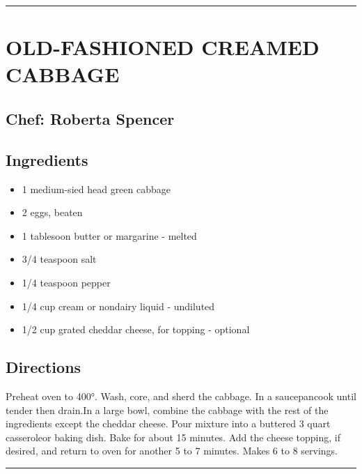 \documentclass[
]{book}
\providecommand{\tightlist}{%
  \setlength{\itemsep}{0pt}\setlength{\parskip}{0pt}}
\begin{document}
\begin{center}\rule{0.5\linewidth}{0.5pt}\end{center}

\hypertarget{old-fashioned-creamed-cabbage}{%
\section*{OLD-FASHIONED CREAMED CABBAGE}\label{old-fashioned-creamed-cabbage}}


\hypertarget{chef-roberta-spencer-8}{%
\subsection*{Chef: Roberta Spencer}\label{chef-roberta-spencer-8}}


\hypertarget{ingredients-34}{%
\subsection*{Ingredients}\label{ingredients-34}}


\begin{itemize}
\tightlist
\item
  1 medium-sied head green cabbage
\item
  2 eggs, beaten
\item
  1 tablesoon butter or margarine - melted
\item
  3/4 teaspoon salt
\item
  1/4 teaspoon pepper
\item
  1/4 cup cream or nondairy liquid - undiluted
\item
  1/2 cup grated cheddar cheese, for topping - optional
\end{itemize}

\hypertarget{directions-34}{%
\subsection*{Directions}\label{directions-34}}


Preheat oven to 400°. Wash, core, and sherd the cabbage. In a saucepancook until tender then drain.In a large bowl, combine the cabbage with the rest of the ingredients except the cheddar cheese. Pour mixture into a buttered 3 quart casseroleor baking dish. Bake for about 15 minutes. Add the cheese topping, if desired, and return to oven for another 5 to 7 minutes. Makes 6 to 8 servings.

\begin{center}\rule{0.5\linewidth}{0.5pt}\end{center}
\end{document}
